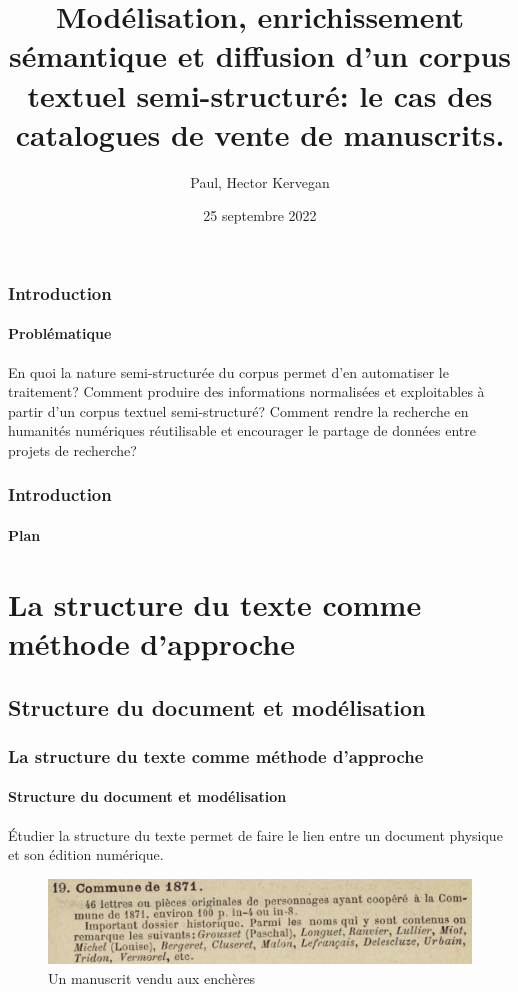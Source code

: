 \documentclass{beamer}
\title{Modélisation, enrichissement sémantique et diffusion d'un corpus textuel semi-structuré: le cas des catalogues de vente de manuscrits.}
\date{25 septembre 2022}
\author[Paul H. Kervegan]{Paul, Hector Kervegan}
\begin{document}
	

\begin{frame}
	\titlepage
\end{frame}

\begin{frame}
	\frametitle{Introduction}
	\framesubtitle{Problématique}
	
	En quoi la nature semi-structurée du corpus permet d'en automatiser le traitement? Comment produire des informations normalisées et exploitables à partir d'un corpus textuel semi-structuré? Comment rendre la recherche en humanités numériques réutilisable et encourager le partage de données entre projets de recherche?
\end{frame}

\begin{frame}
	\frametitle{Introduction}
	\framesubtitle{Plan}
	\tableofcontents
\end{frame}


\section{La structure du texte comme méthode d'approche}
\subsection{Structure du document et modélisation}
\begin{frame}
	\frametitle{La structure du texte comme méthode d'approche}
	\framesubtitle{Structure du document et modélisation}
	
	Étudier la structure du texte permet de faire le lien entre un document physique et son édition numérique.
	
	\begin{figure}[h]
		\centering
		\includegraphics[width=\textwidth]{includes/tei_item.png}
		\caption{Un manuscrit vendu aux enchères}
	\end{figure}
\end{frame}
\end{document}
